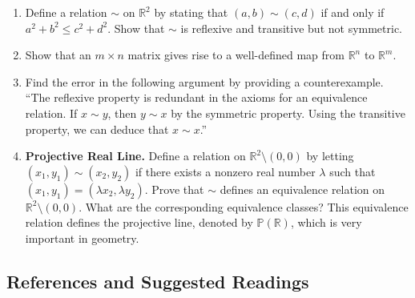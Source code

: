 {\begin{enumerate}
\begin{multicols}{2}
\begin{enumerate}
\item
$m \sim n$ in ${\mathbb Z}$ if $mn > 0$
 
\item
$x \sim y$ in ${\mathbb R}$ if $|x - y| \leq 4$
 
\item
$m \sim n$ in ${\mathbb Z}$ if $m \equiv n \pmod{6}$
 
\end{enumerate}
\end{multicols}
 
 
\item
Define a relation $\sim$ on ${\mathbb R}^2$ by stating that $(a, b) \sim (c, d)$ if and only if $a^2 + b^2 \leq c^2 + d^2$. Show that $\sim$ is reflexive and transitive but not symmetric.
 
\item
Show that an $m \times n$ matrix gives rise to a well-defined  map from ${\mathbb R}^n$ to ${\mathbb R}^m$. 
 
\item
Find the error in the following argument by providing a counterexample. ``The reflexive property is redundant in the axioms for an equivalence relation.  If $x \sim y$, then $y \sim x$ by the symmetric property.  Using the transitive property, we can deduce that $x \sim x$.'' 
 
\item
{\bf Projective Real Line.}
Define a relation on ${\mathbb R}^2 \setminus  (0,0)$ by letting $(x_1, y_1) \sim (x_2, y_2)$ if there exists a nonzero real number $\lambda$ such that $(x_1, y_1)  = ( \lambda x_2, \lambda y_2)$.  Prove that $\sim$ defines an equivalence relation on ${\mathbb R}^2 \setminus (0,0)$.  What are the corresponding  equivalence classes?  This equivalence relation defines the projective line, denoted by  ${\mathbb P}({\mathbb R} )$, which is very important in geometry.
 
\end{enumerate}
}
 
 
\subsection*{References and Suggested Readings} %

